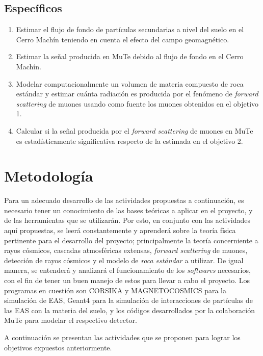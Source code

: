 \documentclass[12pt]{report}
\begin{document}
\subsection*{Específicos}
\begin{enumerate}
    \item Estimar el flujo de fondo de partículas secundarias a nivel del suelo en el Cerro Machín teniendo en cuenta el efecto del campo geomagnético.
    \item Estimar la señal producida en MuTe debido al flujo de fondo en el Cerro Machín.
    \item Modelar computacionalmente un volumen de materia compuesto de roca estándar y estimar cuánta radiación es producida por el fenómeno de \textit{forward scattering} de muones usando como fuente los muones obtenidos en el objetivo 1.
    \item Calcular si la señal producida por el \textit{forward scattering} de muones en MuTe es estadísticamente significativa respecto de la estimada en el objetivo 2.
\end{enumerate}

\section*{Metodología}

Para un adecuado desarrollo de las actividades propuestas a continuación, es necesario tener un conocimiento de las bases teóricas a aplicar en el proyecto, y de las herramientas que se utilizarán. Por esto, en conjunto con las actividades aquí propuestas, se leerá constantemente y aprenderá sobre la teoría física pertinente para el desarrollo del proyecto; principalmente la teoría concerniente a rayos cósmicos, cascadas atmosféricas extensas, \textit{forward scattering} de muones, detección de rayos cósmicos y el modelo de \textit{roca estándar} a utilizar. De igual manera, se entenderá y analizará el funcionamiento de los \textit{softwares} necesarios, con el fin de tener un buen manejo de estos para llevar a cabo el proyecto. Los programas en cuestión son CORSIKA y MAGNETOCOSMICS para la simulación de EAS, Geant4 para la simulación de interacciones de partículas de las EAS con la materia del suelo, y los códigos desarrollados por la colaboración MuTe para modelar el respectivo detector.

A continuación se presentan las actividades que se proponen para lograr los objetivos expuestos anteriormente.
\end{document}
